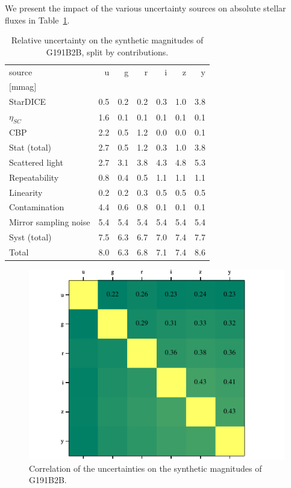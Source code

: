 We present the impact of the various uncertainty sources on absolute
stellar fluxes in Table~\ref{tab:budget}.
\begin{table}
  \centering
  \caption{Relative uncertainty on the synthetic magnitudes of
    G191B2B, split by contributions.}
  \label{tab:budget}
\begin{tabular}{lrrrrrr}
  \toprule
  \toprule
  source & u & g & r & i & z & y \\
  $[$mmag$]$\\
  \midrule
  StarDICE & 0.5 & 0.2 & 0.2 & 0.3 & 1.0 & 3.8 \\
  $\eta_{SC}$ & 1.6 & 0.1 & 0.1 & 0.1 & 0.1 & 0.1 \\
  CBP & 2.2 & 0.5 & 1.2 & 0.0 & 0.0 & 0.1 \\
  \midrule
  Stat (total) & 2.7 & 0.5 & 1.2 & 0.3 & 1.0 & 3.8 \\
  \midrule
  Scattered light & 2.7 & 3.1 & 3.8 & 4.3 & 4.8 & 5.3 \\
  Repeatability & 0.8 & 0.4 & 0.5 & 1.1 & 1.1 & 1.1 \\
  Linearity & 0.2 & 0.2 & 0.3 & 0.5 & 0.5 & 0.5 \\
  Contamination & 4.4 & 0.6 & 0.8 & 0.1 & 0.1 & 0.1 \\
  Mirror sampling noise & 5.4 & 5.4 & 5.4 & 5.4 & 5.4 & 5.4 \\
  \midrule
  Syst (total) & 7.5 & 6.3 & 6.7 & 7.0 & 7.4 & 7.7 \\
  \midrule
  Total & 8.0 & 6.3 & 6.8 & 7.1 & 7.4 & 8.6 \\
\end{tabular}
\end{table}

\begin{figure}
  \centering
  \includegraphics[width=1\linewidth]{fig/bandcorrelation.pdf}
  \caption{Correlation of the uncertainties on the synthetic magnitudes of G191B2B.}
  \label{fig:correlation}
\end{figure}
